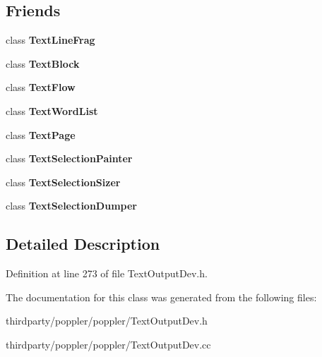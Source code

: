 \subsection*{Friends}
\begin{DoxyCompactItemize}
\item 
\mbox{\label{class_text_line_acb07d216fef09d9e1ff8e8029eb90bd3}} 
class {\bfseries Text\+Line\+Frag}
\item 
\mbox{\label{class_text_line_a10941693a31766eabb041642470df529}} 
class {\bfseries Text\+Block}
\item 
\mbox{\label{class_text_line_a013da25b06e986abc9b0f46aa906eae8}} 
class {\bfseries Text\+Flow}
\item 
\mbox{\label{class_text_line_ab6d080596abe41783ce85827de349c49}} 
class {\bfseries Text\+Word\+List}
\item 
\mbox{\label{class_text_line_aabfaf949a35dc7fec076efc8f20054a8}} 
class {\bfseries Text\+Page}
\item 
\mbox{\label{class_text_line_a478e1ac9857fe7ba0b2079ce49d24e78}} 
class {\bfseries Text\+Selection\+Painter}
\item 
\mbox{\label{class_text_line_ac539f252c1682bb522329d3001a08fe2}} 
class {\bfseries Text\+Selection\+Sizer}
\item 
\mbox{\label{class_text_line_af2dbf093feb7a4386dbeeb5bf5423f29}} 
class {\bfseries Text\+Selection\+Dumper}
\end{DoxyCompactItemize}


\subsection{Detailed Description}


Definition at line 273 of file Text\+Output\+Dev.\+h.



The documentation for this class was generated from the following files\+:\begin{DoxyCompactItemize}
\item 
thirdparty/poppler/poppler/Text\+Output\+Dev.\+h\item 
thirdparty/poppler/poppler/Text\+Output\+Dev.\+cc\end{DoxyCompactItemize}
